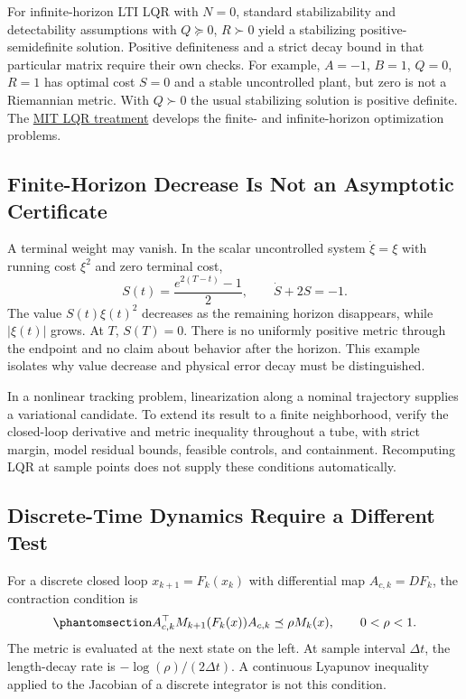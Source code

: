 \documentclass[
  10pt,
  letterpaper,
  DIV=11,
  numbers=noendperiod]{scrartcl}
\begin{document}
For infinite-horizon LTI LQR with \(N=0\), standard stabilizability and
detectability assumptions with \(Q\succeq0\), \(R\succ0\) yield a
stabilizing positive-semidefinite solution. Positive definiteness and a
strict decay bound in that particular matrix require their own checks.
For example, \(A=-1\), \(B=1\), \(Q=0\), \(R=1\) has optimal cost
\(S=0\) and a stable uncontrolled plant, but zero is not a Riemannian
metric. With \(Q\succ0\) the usual stabilizing solution is positive
definite. The \href{https://underactuated.mit.edu/lqr.html}{MIT LQR
treatment} develops the finite- and infinite-horizon optimization
problems.

\subsection{Finite-Horizon Decrease Is Not an Asymptotic
Certificate}\label{finite-horizon-decrease-is-not-an-asymptotic-certificate}

A terminal weight may vanish. In the scalar uncontrolled system
\(\dot\xi=\xi\) with running cost \(\xi^2\) and zero terminal cost, \[
S(t)=\frac{e^{2(T-t)}-1}{2},\qquad \dot S+2S=-1.
\] The value \(S(t)\xi(t)^2\) decreases as the remaining horizon
disappears, while \(|\xi(t)|\) grows. At \(T\), \(S(T)=0\). There is no
uniformly positive metric through the endpoint and no claim about
behavior after the horizon. This example isolates why value decrease and
physical error decay must be distinguished.

In a nonlinear tracking problem, linearization along a nominal
trajectory supplies a variational candidate. To extend its result to a
finite neighborhood, verify the closed-loop derivative and metric
inequality throughout a tube, with strict margin, model residual bounds,
feasible controls, and containment. Recomputing LQR at sample points
does not supply these conditions automatically.

\subsection{Discrete-Time Dynamics Require a Different
Test}\label{discrete-time-dynamics-require-a-different-test}

For a discrete closed loop \(x_{k+1}=F_k(x_k)\) with differential map
\(A_{c,k}=D F_k\), the contraction condition is
\begin{equation}\phantomsection\label{eq-discrete-contraction}{
A_{c,k}^\top M_{k+1}(F_k(x))A_{c,k}\preceq\rho M_k(x),\qquad0<\rho<1.
}\end{equation} The metric is evaluated at the next state on the left.
At sample interval \(\Delta t\), the length-decay rate is
\(-\log(\rho)/(2\Delta t)\). A continuous Lyapunov inequality applied to
the Jacobian of a discrete integrator is not this condition.
\end{document}
